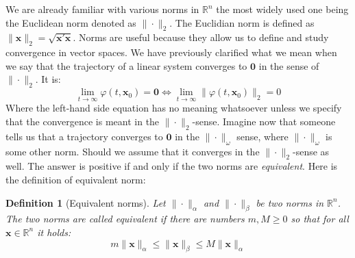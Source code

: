 \documentclass[a4paper,10pt,oneside]{book}
\newtheorem{definition}{Definition}
\begin{document}
We are already familiar with various norms in $\mathbb{R}^n$ the most widely used one being the Euclidean norm denoted as $\|\cdot\|_2$. The Euclidian norm is defined as $\|\mathbf{x}\|_2=\sqrt{\mathbf{x}'\mathbf{x}}$. Norms are useful because they allow us to define and study convergence in vector spaces. We have previously clarified what we mean when we say that the trajectory of a linear system converges to $\mathbf{0}$ in the sense of $\|\cdot\|_2$. It is:
\begin{equation}
 \lim_{t\to\infty}\varphi(t,\mathbf{x}_0)=\mathbf{0}\Leftrightarrow \lim_{t\to\infty}\|\varphi(t,\mathbf{x}_0)\|_2=0
\end{equation}
Where the left-hand side equation has no meaning whatsoever unless we specify that the convergence is meant in the $\|\cdot\|_2$-sense.
Imagine now that someone tells us that a trajectory converges to $\mathbf{0}$ in the $\|\cdot\|_\omega$ sense, where $\|\cdot\|_\omega$ is some other norm. Should we assume that it converges in the $\|\cdot\|_2$-sense as well. The answer is positive if and only if the two norms are \emph{equivalent}. Here is the definition of equivalent norm:
\begin{definition}[Equivalent norms]
 Let $\|\cdot\|_\alpha$ and $\|\cdot\|_\beta$ be two norms in $\mathbb{R}^n$. The two norms are called equivalent if there are numbers $m,M\geq 0$ so that for all $\mathbf{x}\in\mathbb{R}^n$ it holds:
\begin{equation}
 m\|\mathbf{x}\|_\alpha \leq \|\mathbf{x}\|_\beta \leq M\|\mathbf{x}\|_\alpha
\end{equation}
\end{definition}
\end{document}
